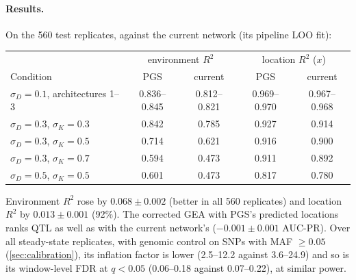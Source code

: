 \paragraph{Results.} On the 560 test replicates, against the current
network (its pipeline LOO fit):

\begin{center}
\begin{tabular}{lcccc}
\toprule
 & \multicolumn{2}{c}{environment $R^2$} & \multicolumn{2}{c}{location $R^2$ ($x$)} \\
Condition & PGS & current & PGS & current \\
\midrule
$\sigma_D=0.1$, architectures 1--3 & 0.836--0.845 & 0.812--0.821 & 0.969--0.970 & 0.967--0.968 \\
$\sigma_D=0.3$, $\sigma_K=0.3$ & 0.842 & 0.785 & 0.927 & 0.914 \\
$\sigma_D=0.3$, $\sigma_K=0.5$ & 0.714 & 0.621 & 0.916 & 0.900 \\
$\sigma_D=0.3$, $\sigma_K=0.7$ & 0.594 & 0.473 & 0.911 & 0.892 \\
$\sigma_D=0.5$, $\sigma_K=0.5$ & 0.601 & 0.473 & 0.817 & 0.780 \\
\bottomrule
\end{tabular}
\end{center}

\noindent Environment $R^2$ rose by $0.068 \pm 0.002$ (better in all 560
replicates) and location $R^2$ by $0.013 \pm 0.001$ (92\%). The
corrected GEA with PGS's predicted locations ranks QTL as well as with the
current network's ($-0.001 \pm 0.001$ AUC-PR). Over all steady-state
replicates, with genomic control on SNPs with MAF $\geq 0.05$
(\cref{sec:calibration}), its inflation factor is lower (2.5--12.2 against
3.6--24.9) and so is its window-level FDR at $q<0.05$ (0.06--0.18 against
0.07--0.22), at similar power.



